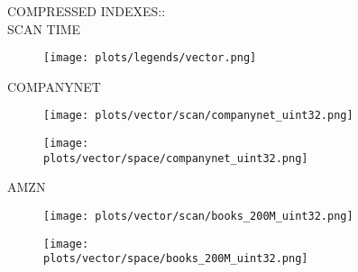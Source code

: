 \documentclass{article}
\begin{document}
\begin{figure}[!htbp]
\fbox
{
\begin{minipage}[t][0.98\textheight][t]{\textwidth}
\centering
    \begin{minipage}{0.23\linewidth}
    \footnotesize{COMPRESSED INDEXES::\\ SCAN TIME}
    \end{minipage}
   \begin{minipage}{0.75\linewidth}
        \begin{figure}[H]
        \texttt{[image: plots/legends/vector.png]}
        \end{figure}
    \end{minipage}
    \vspace*{-7px} 

    \begin{minipage}{0.03\linewidth}
    \begin{sideways}\small COMPANYNET\end{sideways}
    \end{minipage}
    \begin{minipage}{0.32\linewidth}
        \begin{figure}[H]
        \texttt{[image: plots/vector/scan/companynet\_uint32.png]}
        \end{figure}
    \end{minipage}
    \begin{minipage}{0.32\linewidth}
        \begin{figure}[H]
            \texttt{[image: plots/vector/space/companynet\_uint32.png]}
        \end{figure}
    \end{minipage}
     \vspace*{-15px}

    \begin{minipage}{0.03\linewidth}
    \begin{sideways}\small AMZN\end{sideways}
    \end{minipage}
    \begin{minipage}{0.32\linewidth}
        \begin{figure}[H]
        \texttt{[image: plots/vector/scan/books\_200M\_uint32.png]}
        \end{figure}
    \end{minipage}
    \begin{minipage}{0.32\linewidth}
        \begin{figure}[H]
            \texttt{[image: plots/vector/space/books\_200M\_uint32.png]}
        \end{figure}
    \end{minipage}
     \vspace*{-15px}


\end{minipage}}
\end{figure}
\end{document}
